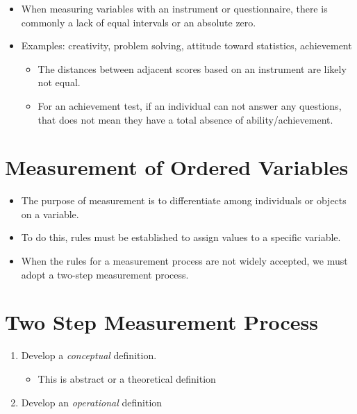 \documentclass[12pt]{article}
\begin{document}
\begin{itemize}
\itemsep1pt\parskip0pt
\item
  When measuring variables with an instrument or questionnaire, there is
  commonly a lack of equal intervals or an absolute zero.
\item
  Examples: creativity, problem solving, attitude toward statistics,
  achievement

  \begin{itemize}
  \itemsep1pt\parskip0pt
  \item
    The distances between adjacent scores based on an instrument are
    likely not equal.
  \item
    For an achievement test, if an individual can not answer any
    questions, that does not mean they have a total absence of
    ability/achievement.
  \end{itemize}
\end{itemize}

\section{Measurement of Ordered
Variables}\label{measurement-of-ordered-variables}

\begin{itemize}
\itemsep1pt\parskip0pt
\item
  The purpose of measurement is to differentiate among individuals or
  objects on a variable.
\item
  To do this, rules must be established to assign values to a specific
  variable.
\item
  When the rules for a measurement process are not widely accepted, we
  must adopt a two-step measurement process.
\end{itemize}

\section{Two Step Measurement
Process}\label{two-step-measurement-process}

\begin{enumerate}
\def\labelenumi{\arabic{enumi}.}
\itemsep1pt\parskip0pt
\item
  Develop a \emph{conceptual} definition.

  \begin{itemize}
  \itemsep1pt\parskip0pt
  \item
    This is abstract or a theoretical definition
  \end{itemize}
\item
  Develop an \emph{operational} definition
\end{enumerate}
\end{document}
